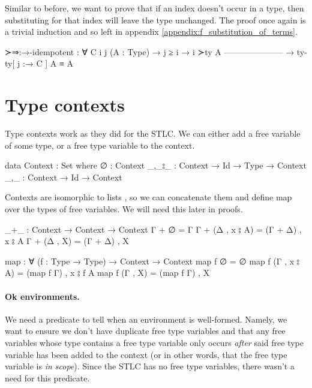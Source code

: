 \documentclass[logo,bsc,singlespacing,parskip,online]{infthesis}
\begin{document}
Similar to before, we want to prove that if an index doesn't occur in a type, then substituting for
that index will leave the type unchanged. The proof once again is a trivial induction and so left in appendix \ref{appendix:f_substitution_of_terms}.
\begin{code}
  ≻⇒:→-idempotent : ∀ {C i j} (A : Type)
    → j ≥ i       → i ≻ty A
      ---------------------
    → ty-ty[ j :→ C ] A ≡ A
\end{code}

\section{Type contexts}
Type contexts work as they did for the STLC. We can either add a free variable of some type, or a
free type variable to the context.
\begin{code}
  data Context : Set where
    ∅ : Context
    _,_⦂_ : Context → Id → Type → Context
    _,_ : Context → Id → Context
\end{code}

Contexts are isomorphic to lists \citep{wadler_programming_2022}, so we can concatenate them and
define map over the types of free variables. We will need this later in proofs.
\begin{code}
  _+_ : Context → Context → Context
  Γ + ∅ = Γ
  Γ + (Δ , x ⦂ A) = (Γ + Δ) , x ⦂ A
  Γ + (Δ , X) = (Γ + Δ) , X

  map : ∀ (f : Type → Type) → Context → Context
  map f ∅ = ∅
  map f (Γ , x ⦂ A) = (map f Γ) , x ⦂ f A
  map f (Γ , X) = (map f Γ) , X
\end{code}

\paragraph*{Ok environments.} We need a predicate to tell when an environment is well-formed.
Namely, we want to ensure we don't have duplicate free type variables and that any free variables
whose type contains a free type variable only occurs \textit{after} said free type variable has been
added to the context (or in other words, that the free type variable is \textit{in scope}). Since
the STLC has no free type variables, there wasn't a need for this predicate.
\end{document}
